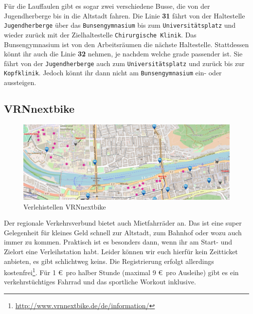 Für die Lauffaulen gibt es sogar zwei verschiedene Busse, die von der Jugendherberge bis in die Altstadt fahren. Die Linie \textbf{31} fährt von der Haltestelle \texttt{Jugendherberge} über das \texttt{Bunsengymnasium} bis zum \texttt{Universitätsplatz} und wieder zurück mit der Zielhaltestelle \texttt{Chirurgische Klinik}. Das Bunsengymnasium ist von den Arbeitsräumen die nächste Haltestelle. Stattdessen könnt ihr auch die Linie \textbf{32} nehmen, je nachdem welche grade passender ist. Sie fährt von der \texttt{Jugendherberge} auch zum \texttt{Universitätsplatz} und zurück bis zur \texttt{Kopfklinik}. Jedoch könnt ihr dann nicht am \texttt{Bunsengymnasium} ein- oder aussteigen.

\subsection{VRNnextbike}

\begin{figure}[t]
  \includegraphics[width=1.0\textwidth]{chapters/heidelberg/nextbike}
  \caption*{Verlehistellen VRNnextbike}
  \label{nextbike}
\end{figure}

Der regionale Verkehrsverbund bietet auch Mietfahrräder an. Das ist eine super Gelegenheit  für kleines Geld schnell zur Altstadt, zum Bahnhof oder wozu auch immer zu kommen.  Praktisch ist es besonders dann, wenn ihr am Start- und Zielort eine Verleihstation habt. Leider können wir euch hierfür kein Zeitticket anbieten, es gibt schlichtweg keins. Die Registrierung erfolgt allerdings kostenfrei\footnote{\url{http://www.vrnnextbike.de/de/information/}}. Für 1 \euro \, pro halber Stunde (maximal 9 \euro \, pro Ausleihe) gibt es ein verkehrstüchtiges Fahrrad und das sportliche Workout inklusive.



